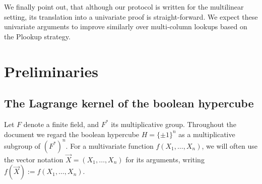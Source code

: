 \documentclass[11pt]{article}
\theoremstyle{definition}
\theoremstyle{definition}
\begin{document}
We finally point out, that although our protocol is written for the multilinear setting, its translation into a univariate proof is straight-forward.
We expect these univariate arguments to improve similarly over multi-column lookups based on the Plookup strategy.






\section{Preliminaries}
\label{s:preliminaries}

\subsection{The Lagrange kernel of the boolean hypercube}

Let $F$ denote a finite field, and $F^*$ its multiplicative group.
Throughout the document we regard the boolean hypercube $H= \{\pm 1\}^n$  as a multiplicative subgroup of  $(F^*)^n$.
For a multivariate function $f(X_1,\ldots, X_n)$, we will often use the vector notation $\vec X = (X_1,\ldots, X_n)$ for its arguments, writing $f(\vec X) := f(X_1,\ldots, X_n)$.
 
\end{document}
